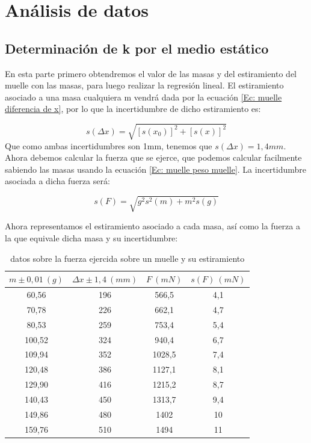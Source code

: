 \documentclass[12pt,a4paper]{book}
\begin{document}
\section{Análisis de datos}

\subsection{Determinación de k por el medio estático}
En esta parte primero obtendremos el valor de las masas y del estiramiento del muelle con las masas, para luego realizar la regresión lineal. El estiramiento asociado a una masa cualquiera m vendrá dada por la ecuación \ref{Ec: muelle diferencia de x}, por lo que la incertidumbre de dicho estiramiento es:

\begin{equation}
s(\Delta x)=\sqrt{[s(x_0)]^2+[s(x)]^2}
\end{equation}
Que como ambas incertidumbres son 1mm, tenemos que $s(\Delta x)=1,4mm$.  \\

Ahora debemos calcular la fuerza que se ejerce, que podemos calcular facilmente sabiendo las masas usando la ecuación \ref{Ec: muelle peso muelle}. La incertidumbre asociada a dicha fuerza será:

\begin{equation}
s(F)=\sqrt{g^2s^2(m)+m^2s(g)}
\label{Ec: muelle incertidumbre F}
\end{equation}

Ahora representamos el estiramiento asociado a cada masa, así como la fuerza a la que equivale dicha masa y su incertidumbre: 
 
\begin{table}[h!] %
\begin{center}
\begin{tabular}{|c|c|c|c|}
\hline$ m \pm 0,01 \ (g) $ & 	 $ \Delta x \pm 1,4 \ (mm) $ & 	 $F \ (mN) $ & 	 $s(F) \ (mN)$ \\ \hline
60,56 & 	 196 & 	 566,5 & 	 4,1 \\ 
70,78 & 	 226 & 	 662,1 & 	 4,7 \\ 
80,53 & 	 259 & 	 753,4 & 	 5,4 \\ 
100,52 & 	 324 & 	 940,4 & 	 6,7 \\ 
109,94 & 	 352 & 	 1028,5 & 	 7,4 \\ 
120,48 & 	 386 & 	 1127,1 & 	 8,1 \\ 
129,90 & 	 416 & 	 1215,2 & 	 8,7 \\ 
140,43 & 	 450 & 	 1313,7 & 	 9,4 \\ 
149,86 & 	 480 & 	 1402 & 	 10 \\ 
159,76 & 	 510 & 	 1494 & 	 11 \\ \hline
\end{tabular}
\label{Tab:Muelle delta x vs F}

\caption{datos sobre la fuerza ejercida sobre un muelle y su estiramiento}
\end{center}
\end{table}
\end{document}
